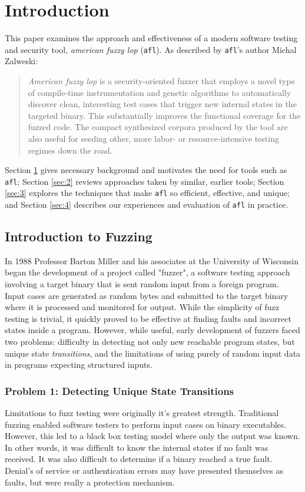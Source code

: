 \chapter{Introduction}
\label{sec:1}

This paper examines the approach and effectiveness of a modern
software testing and security tool, \textit{american fuzzy lop}\cite{afl-main} (\texttt{afl}).
As described by \texttt{afl}'s author Michal Zalweski\cite{afl-main}:
\begin{quote}
\textit{American fuzzy lop} is a security-oriented fuzzer that employs a novel type of compile-time instrumentation and genetic algorithms to automatically discover clean, interesting test cases that trigger new internal states in the targeted binary. This substantially improves the functional coverage for the fuzzed code. The compact synthesized corpora produced by the tool are also useful for seeding other, more labor- or resource-intensive testing regimes down the road. 
\end{quote}

Section \ref{sec:1} gives necessary background and motivates the need for
tools such as \texttt{afl}; Section \ref{sec:2} reviews approaches taken by similar,
earlier tools; Section \ref{sec:3} explores the techniques that make
\texttt{afl} so efficient, effective, and unique; and Section \ref{sec:4}
describes our experiences and evaluation of \texttt{afl} in practice.

\section{Introduction to Fuzzing}

In 1988 Professor Barton Miller and his associates at the University of Wisconsin began the development of a project called "fuzzer"\cite{mil-fuzz}, a software testing approach involving a target binary that is sent random input from a foreign program.
 Input cases are generated as random bytes and submitted to the target binary where it is processed and monitored for output. While the simplicity of fuzz testing is trivial, it quickly proved to be effective at finding faults and incorrect states inside a program. 
However, while useful, early development of fuzzers faced two problems: difficulty in detecting not only new reachable program states, but  unique state \textit{transitions}, and the limitations of using purely of random input data in programs expecting structured inputs.

\subsection{Problem 1: Detecting Unique State Transitions}
Limitations to fuzz testing were originally it's greatest strength. Traditional fuzzing enabled software testers to perform input cases on binary executables. 
However, this led to a black box testing model where only the output was known.  In other words, it was difficult to know the internal states if no fault was received. It was also difficult to determine
if a binary reached a true fault. Denial's of service or authentication errors may have presented themselves as faults, but were really a protection mechanism.

